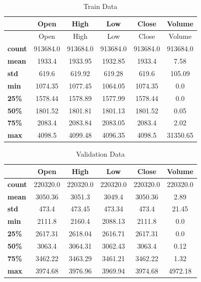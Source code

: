 \begin{table}[H]
    \centering
    \begin{tabular}{L{1.5cm}ccccc}
        \toprule
        & Open & High & Low & Close & Volume
        \\
        \midrule
        & Open & High & Low & Close & Volume
        \\
        \textbf{count} & 913684.0 & 913684.0 & 913684.0 & 913684.0 & 913684.0 \\
        \textbf{mean}  & 1933.4   & 1933.95  & 1932.85  & 1933.4   & 7.58     \\
        \textbf{std}   & 619.6    & 619.92   & 619.28   & 619.6    & 105.09   \\
        \textbf{min}   & 1074.35  & 1077.45  & 1064.05  & 1074.35  & 0.0      \\
        \textbf{25\%}  & 1578.44  & 1578.89  & 1577.99  & 1578.44  & 0.0      \\
        \textbf{50\%}  & 1801.52  & 1801.81  & 1801.13  & 1801.52  & 0.05     \\
        \textbf{75\%}  & 2083.4   & 2083.84  & 2083.05  & 2083.4   & 2.02     \\
        \textbf{max}   & 4098.5   & 4099.48  & 4096.35  & 4098.5   & 31350.65 \\
        \bottomrule
    \end{tabular}
    \caption{Train Data}
    \label{tbl:train-data}
\end{table}

\begin{table}[H]
    \centering
    \begin{tabular}{L{1.5cm}ccccc}
        \toprule
        & Open & High & Low & Close & Volume
        \\
        \midrule
        \textbf{count} & 220320.0 & 220320.0 & 220320.0 & 220320.0 & 220320.0 \\
        \textbf{mean}  & 3050.36  & 3051.3   & 3049.4   & 3050.36  & 2.89     \\
        \textbf{std}   & 473.4    & 473.45   & 473.34   & 473.4    & 21.45    \\
        \textbf{min}   & 2111.8   & 2160.4   & 2088.13  & 2111.8   & 0.0      \\
        \textbf{25\%}  & 2617.31  & 2618.04  & 2616.71  & 2617.31  & 0.0      \\
        \textbf{50\%}  & 3063.4   & 3064.31  & 3062.43  & 3063.4   & 0.12     \\
        \textbf{75\%}  & 3462.22  & 3463.29  & 3461.21  & 3462.22  & 1.32     \\
        \textbf{max}   & 3974.68  & 3976.96  & 3969.94  & 3974.68  & 4972.18  \\
        \bottomrule
    \end{tabular}
    \caption{Validation Data}
    \label{tbl:validation-data}
\end{table}

